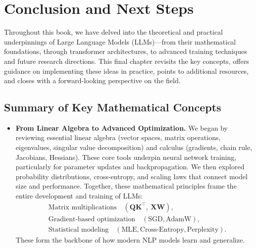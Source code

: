 \chapter{Conclusion and Next Steps}
\label{chap:conclusion_next_steps}

\noindent
Throughout this book, we have delved into the theoretical and practical underpinnings of Large Language Models (LLMs)—from their mathematical foundations, through transformer architectures, to advanced training techniques and future research directions. This final chapter revisits the key concepts, offers guidance on implementing these ideas in practice, points to additional resources, and closes with a forward-looking perspective on the field.

\section{Summary of Key Mathematical Concepts}
\label{sec:summary_math_concepts}
\begin{itemize}
    \item \textbf{From Linear Algebra to Advanced Optimization.}
    We began by reviewing essential linear algebra (vector spaces, matrix operations, eigenvalues, singular value decomposition) and calculus (gradients, chain rule, Jacobians, Hessians). These core tools underpin neural network training, particularly for parameter updates and backpropagation. We then explored probability distributions, cross-entropy, and scaling laws that connect model size and performance. Together, these mathematical principles frame the entire development and training of LLMs:
    \begin{equation}\label{eq:math_concepts}
      \begin{aligned}
      &\text{Matrix multiplications} \quad(\mathbf{Q}\mathbf{K}^\top,\ \mathbf{X}\mathbf{W}),\\
      &\text{Gradient-based optimization} \quad(\text{SGD}, \text{AdamW}),\\
      &\text{Statistical modeling} \quad(\text{MLE}, \text{Cross-Entropy}, \text{Perplexity}).
      \end{aligned}
    \end{equation}
    These form the backbone of how modern NLP models learn and generalize.
\end{itemize}

